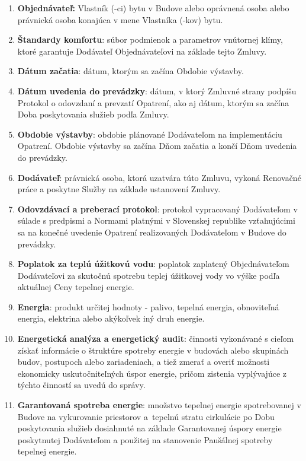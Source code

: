 \begin{multicols}{2}
\begin{enumerate}
\item\textbf{Objednávateľ:} Vlastník (-ci) bytu v Budove alebo oprávnená
osoba alebo právnická osoba konajúca v mene Vlastníka (-kov) bytu.

\item\textbf{Štandardy komfortu}: súbor podmienok a parametrov vnútornej
klímy, ktoré garantuje Dodávateľ Objednávateľovi na základe tejto
Zmluvy.

\item\textbf{Dátum začatia}: dátum, ktorým sa začína Obdobie výstavby.

\item\textbf{Dátum uvedenia do prevádzky}: dátum, v ktorý Zmluvné strany
podpíšu Protokol o odovzdaní a prevzatí Opatrení, ako aj dátum, ktorým
sa začína Doba poskytovania služieb podľa Zmluvy.

\item\textbf{Obdobie výstavby}: obdobie plánované Dodávateľom na
implementáciu Opatrení. Obdobie výstavby sa začína Dňom začatia a končí
Dňom uvedenia do prevádzky.

\item\textbf{Dodávateľ}: právnická osoba, ktorá uzatvára túto Zmluvu, vykoná
Renovačné práce a poskytne Služby na základe ustanovení Zmluvy.

\item\textbf{Odovzdávací a preberací protokol}: protokol vypracovaný
Dodávateľom v súlade s predpismi a Normami platnými v Slovenskej
republike vzťahujúcimi sa na konečné uvedenie Opatrení realizovaných
Dodávateľom v Budove do prevádzky.

\item\textbf{Poplatok za teplú úžitkovú vodu}: poplatok zaplatený
Objednávateľom Dodávateľovi za skutočnú spotrebu teplej úžitkovej vody
vo výške podľa aktuálnej Ceny tepelnej energie.

\item\textbf{Energia}: produkt určitej hodnoty - palivo, tepelná energia,
obnoviteľná energia, elektrina alebo akýkoľvek iný druh energie.

\item\textbf{Energetická analýza a energetický audit}: činnosti vykonávané s
cieľom získať informácie o štruktúre spotreby energie v budovách alebo
skupinách budov, postupoch alebo zariadeniach, a tiež zmerať a overiť
možnosti ekonomicky uskutočniteľných úspor energie, pričom zistenia
vyplývajúce z týchto činností sa uvedú do správy.

\item\textbf{Garantovaná spotreba energie}: množstvo tepelnej energie
spotrebovanej v Budove na vykurovanie priestorov a~tepelnú stratu
cirkulácie po Dobu poskytovania služieb dosiahnuté na základe
Garantovanej úspory energie poskytnutej Dodávateľom a použitej na
stanovenie Paušálnej spotreby tepelnej energie.


\end{enumerate}
\end{multicols}
